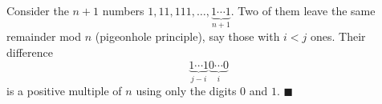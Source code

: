 Consider the $n+1$ numbers $1,11,111,\dots,\underbrace{1\cdots1}_{n+1}$. Two of them leave the same remainder mod $n$ (pigeonhole principle), say those with $i<j$ ones. Their difference
\[\underbrace{1\cdots1}_{j-i}\underbrace{0\cdots0}_{i}\]
is a positive multiple of $n$ using only the digits $0$ and $1$. $\blacksquare$
